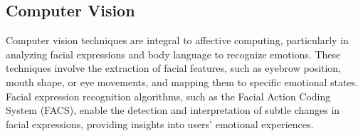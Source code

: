 \subsection{Computer Vision}

Computer vision techniques are integral to affective computing, particularly in analyzing facial expressions and body language to recognize emotions. 
These techniques involve the extraction of facial features, such as eyebrow position, mouth shape, or eye movements, and mapping them to specific emotional states.
 Facial expression recognition algorithms, such as the Facial Action Coding System (FACS), 
enable the detection and interpretation of subtle changes in facial expressions, providing insights into users' emotional experiences.